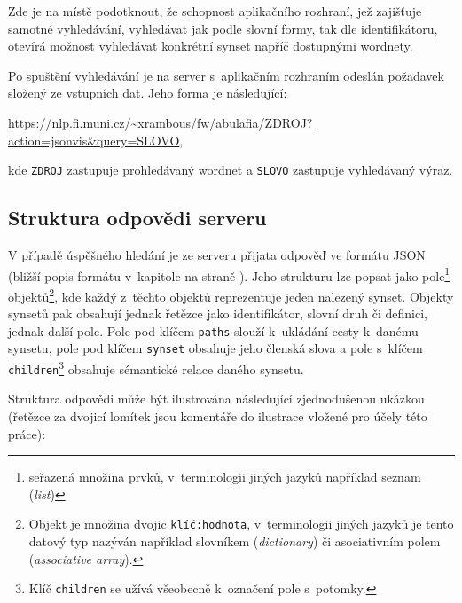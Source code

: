 \documentclass[a4paper, 11pt, oneside, showtrims]{book}
\newcommand{\itNameRef}[1]{\textit{\nameref{#1}}}
\begin{document}
					Zde je na místě podotknout, že schopnost aplikačního rozhraní, jež zajišťuje samotné vyhledávání, vyhledávat jak podle slovní formy, tak dle identifikátoru, otevírá možnost vyhledávat konkrétní synset napříč dostupnými wordnety. 

					Po spuštění vyhledávání je na server s~aplikačním rozhraním odeslán požadavek složený ze vstupních dat. Jeho forma je následující:

					\medskip
					\url{https://nlp.fi.muni.cz/~xrambous/fw/abulafia/ZDROJ?action=jsonvis&query=SLOVO}\hspace{1em},
					\medskip

					kde \texttt{ZDROJ} zastupuje prohledávaný wordnet a \texttt{SLOVO} zastupuje vyhledávaný výraz.

				\subsection{Struktura odpovědi serveru}
				\label{cha:answerStruct}

					V případě úspěšného hledání je ze serveru přijata odpověď ve formátu JSON (bližší popis formátu v~kapitole \itNameRef{cha:json} na straně \pageref{cha:json}). Jeho strukturu lze popsat jako pole\footnote{seřazená množina prvků, v~terminologii jiných jazyků například seznam (\textit{list})} objektů\footnote{Objekt je množina dvojic \texttt{klíč:hodnota}, v~terminologii jiných jazyků je tento datový typ nazýván například slovníkem (\textit{dictionary}) či asociativním polem (\textit{associative array}).}, kde každý z~těchto objektů reprezentuje jeden nalezený synset. Objekty synsetů pak obsahují jednak řetězce jako identifikátor, slovní druh či definici, jednak další pole. Pole pod klíčem \texttt{paths} slouží k~ukládání cesty k~danému synsetu, pole pod klíčem \texttt{synset} obsahuje jeho členská slova a pole s~klíčem \texttt{children}\footnote{Klíč \texttt{children} se užívá všeobecně k~označení pole s~potomky.} obsahuje sémantické relace daného synsetu. 

					Struktura odpovědi může být ilustrována následující zjednodušenou ukázkou (řetězce za dvojicí lomítek jsou komentáře do ilustrace vložené pro účely této práce):
\end{document}
